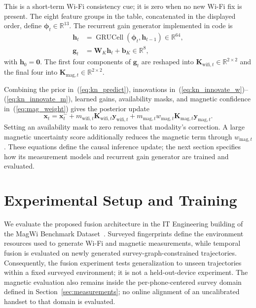 \documentclass[conference]{IEEEtran}
\begin{document}
This is a short-term Wi-Fi consistency cue; it is zero when no new Wi-Fi fix is present. The eight feature groups in the table, concatenated in the displayed order, define $\boldsymbol{\phi}_t\in\mathbb{R}^{13}$. The recurrent gain generator implemented in code is
\begin{align}
\mathbf{h}_t
&=\operatorname{GRUCell}(\boldsymbol{\phi}_t,\mathbf{h}_{t-1})
\in\mathbb{R}^{64},
\label{eq:gru_recurrence}\\
\mathbf{g}_t
&=\mathbf{W}_K\mathbf{h}_t+\mathbf{b}_K
\in\mathbb{R}^{8},
\label{eq:gain_head}
\end{align}
with $\mathbf{h}_0=\mathbf{0}$. The first four components of $\mathbf{g}_t$ are reshaped into $\mathbf{K}_{\mathrm{wifi},t}\in\mathbb{R}^{2\times2}$ and the final four into $\mathbf{K}_{\mathrm{mag},t}\in\mathbb{R}^{2\times2}$.

Combining the prior in~(\ref{eq:kn_predict}), innovations in~(\ref{eq:kn_innovate_w})--(\ref{eq:kn_innovate_m}), learned gains, availability masks, and magnetic confidence in~(\ref{eq:mag_weight}) gives the posterior update
\begin{equation}
\mathbf{x}_t=\mathbf{x}_t^{-}
+m_{\mathrm{wifi},t}\mathbf{K}_{\mathrm{wifi},t}\mathbf{y}_{\mathrm{wifi},t}
+m_{\mathrm{mag},t}w_{\mathrm{mag},t}\mathbf{K}_{\mathrm{mag},t}\mathbf{y}_{\mathrm{mag},t}.
\label{eq:kn_correct}
\end{equation}
Setting an availability mask to zero removes that modality's correction. A large magnetic uncertainty score additionally reduces the magnetic term through $w_{\mathrm{mag},t}$. These equations define the causal inference update; the next section specifies how its measurement models and recurrent gain generator are trained and evaluated.

\section{Experimental Setup and Training}\label{sec:setup}

We evaluate the proposed fusion architecture in the IT Engineering building of the MagWi Benchmark Dataset~\cite{magwi}. Surveyed fingerprints define the environment resources used to generate Wi-Fi and magnetic measurements, while temporal fusion is evaluated on newly generated survey-graph-constrained trajectories. Consequently, the fusion experiment tests generalization to unseen trajectories within a fixed surveyed environment; it is not a held-out-device experiment. The magnetic evaluation also remains inside the per-phone-centered survey domain defined in Section~\ref{sec:measurements}; no online alignment of an uncalibrated handset to that domain is evaluated.
\end{document}
